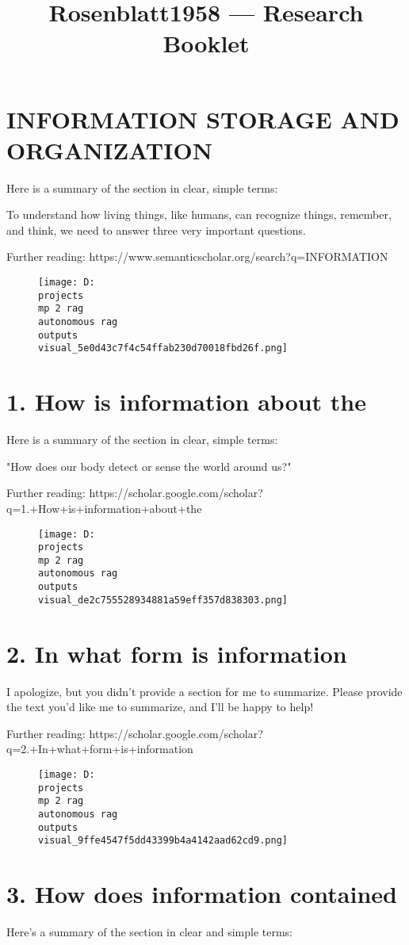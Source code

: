 \documentclass[12pt,a4paper]{article}
\title{Rosenblatt1958 — Research Booklet}
\date{}
\begin{document}
\maketitle
\tableofcontents
\newpage
\section{INFORMATION STORAGE AND ORGANIZATION}
Here is a summary of the section in clear, simple terms:

To understand how living things, like humans, can recognize things, remember, and think, we need to answer three very important questions.

Further reading: https://www.semanticscholar.org/search?q=INFORMATION%
\begin{figure}[h]
\centering
\texttt{[image: D:\\projects\\mp 2 rag\\autonomous rag\\outputs\\visual\_5e0d43c7f4c54ffab230d70018fbd26f.png]}
\end{figure}
\section{1. How is information about the}
Here is a summary of the section in clear, simple terms:

"How does our body detect or sense the world around us?"

Further reading: https://scholar.google.com/scholar?q=1.+How+is+information+about+the
\begin{figure}[h]
\centering
\texttt{[image: D:\\projects\\mp 2 rag\\autonomous rag\\outputs\\visual\_de2c755528934881a59eff357d838303.png]}
\end{figure}
\section{2. In what form is information}
I apologize, but you didn't provide a section for me to summarize. Please provide the text you'd like me to summarize, and I'll be happy to help!

Further reading: https://scholar.google.com/scholar?q=2.+In+what+form+is+information
\begin{figure}[h]
\centering
\texttt{[image: D:\\projects\\mp 2 rag\\autonomous rag\\outputs\\visual\_9ffe4547f5dd43399b4a4142aad62cd9.png]}
\end{figure}
\section{3. How does information contained}
Here's a summary of the section in clear and simple terms:
\end{document}
